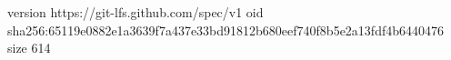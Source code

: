 version https://git-lfs.github.com/spec/v1
oid sha256:65119e0882e1a3639f7a437e33bd91812b680eef740f8b5e2a13fdf4b6440476
size 614

